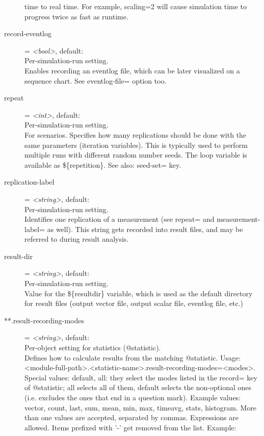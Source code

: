 \begin{description}
    time to real time. For example, scaling=2 will cause simulation time to
    progress twice as fast as runtime.
\item[record-eventlog] = \textit{<bool>}, default: \\
    Per-simulation-run setting.\\
    Enables recording an eventlog file, which can be later visualized on a
    sequence chart. See eventlog-file= option too.
\item[repeat] = \textit{<int>}, default: \\
    Per-simulation-run setting.\\
    For scenarios. Specifies how many replications should be done with the same
    parameters (iteration variables). This is typically used to perform
    multiple runs with different random number seeds. The loop variable is
    available as \$\{repetition\}. See also: seed-set= key.
\item[replication-label] = \textit{<string>}, default: \\
    Per-simulation-run setting.\\
    Identifies one replication of a measurement (see repeat= and
    measurement-label= as well). This string gets recorded into result files,
    and may be referred to during result analysis.
\item[result-dir] = \textit{<string>}, default: \\
    Per-simulation-run setting.\\
    Value for the \$\{resultdir\} variable, which is used as the default
    directory for result files (output vector file, output scalar file,
    eventlog file, etc.)
\item[**.result-recording-modes] = \textit{<string>}, default: \\
    Per-object setting for statistics (@statistic).\\
    Defines how to calculate results from the matching @statistic. Usage:
    <module-full-path>.<statistic-name>.result-recording-modes=<modes>. Special
    values: default, all: they select the modes listed in the record= key of
    @statistic; all selects all of them, default selects the non-optional ones
    (i.e. excludes the ones that end in a question mark). Example values:
    vector, count, last, sum, mean, min, max, timeavg, stats, histogram. More
    than one values are accepted, separated by commas. Expressions are allowed.
    Items prefixed with '-' get removed from the list. Example:

\end{description}

